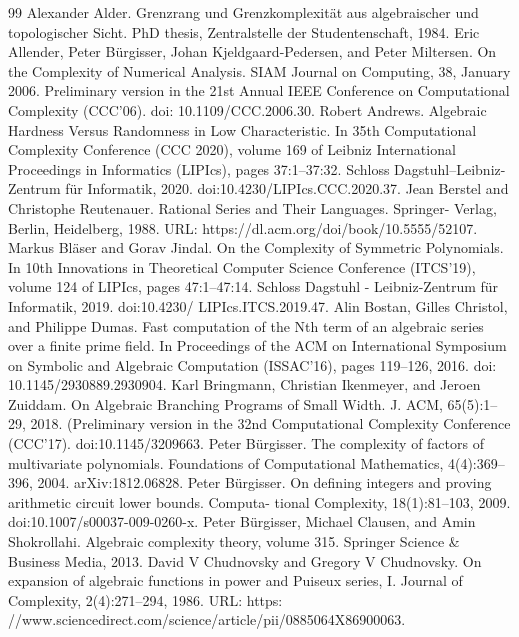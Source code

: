 \documentclass[10pt,a4paper]{article}
\begin{document}
\begin{thebibliography}{99}
 Alexander Alder. Grenzrang und Grenzkomplexität aus algebraischer und topologischer Sicht. PhD thesis, Zentralstelle der Studentenschaft, 1984.
 Eric Allender, Peter Bürgisser, Johan Kjeldgaard-Pedersen, and Peter Miltersen. On the Complexity of Numerical Analysis. SIAM Journal on Computing, 38, January 2006. Preliminary version in the 21st Annual IEEE Conference on Computational Complexity (CCC’06). doi: 10.1109/CCC.2006.30.
 Robert Andrews. Algebraic Hardness Versus Randomness in Low Characteristic. In 35th Computational Complexity Conference (CCC 2020), volume 169 of Leibniz International Proceedings in Informatics (LIPIcs), pages 37:1–37:32. Schloss Dagstuhl–Leibniz-Zentrum für Informatik, 2020. doi:10.4230/LIPIcs.CCC.2020.37.
 Jean Berstel and Christophe Reutenauer. Rational Series and Their Languages. Springer- Verlag, Berlin, Heidelberg, 1988. URL: https://dl.acm.org/doi/book/10.5555/52107.
 Markus Bläser and Gorav Jindal. On the Complexity of Symmetric Polynomials. In 10th Innovations in Theoretical Computer Science Conference (ITCS’19), volume 124 of LIPIcs, pages 47:1–47:14. Schloss Dagstuhl - Leibniz-Zentrum für Informatik, 2019. doi:10.4230/ LIPIcs.ITCS.2019.47.
 Alin Bostan, Gilles Christol, and Philippe Dumas. Fast computation of the Nth term of an algebraic series over a finite prime field. In Proceedings of the ACM on International Symposium on Symbolic and Algebraic Computation (ISSAC’16), pages 119–126, 2016. doi: 10.1145/2930889.2930904.
 Karl Bringmann, Christian Ikenmeyer, and Jeroen Zuiddam. On Algebraic Branching Programs of Small Width. J. ACM, 65(5):1–29, 2018. (Preliminary version in the 32nd Computational Complexity Conference (CCC’17). doi:10.1145/3209663.
 Peter Bürgisser. The complexity of factors of multivariate polynomials. Foundations of Computational Mathematics, 4(4):369–396, 2004. arXiv:1812.06828.
 Peter Bürgisser. On defining integers and proving arithmetic circuit lower bounds. Computa- tional Complexity, 18(1):81–103, 2009. doi:10.1007/s00037-009-0260-x.
 Peter Bürgisser, Michael Clausen, and Amin Shokrollahi. Algebraic complexity theory, volume 315. Springer Science \& Business Media, 2013.
 David V Chudnovsky and Gregory V Chudnovsky. On expansion of algebraic functions in power and Puiseux series, I. Journal of Complexity, 2(4):271–294, 1986. URL: https: //www.sciencedirect.com/science/article/pii/0885064X86900063.

\end{thebibliography}
\end{document}
